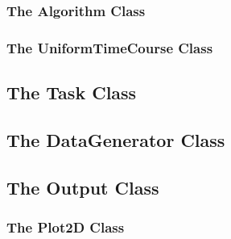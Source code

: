  \subsubsection[Algorithm]{The Algorithm Class}
 

 \subsubsection[UniformTimeCourse]{The UniformTimeCourse Class}
 


%

%


 \subsection[Task]{The Task Class}
 


 \subsection[DataGenerator]{The DataGenerator Class}
 


\subsection[Output]{The Output Class}


\subsubsection[Plot2D]{The Plot2D Class}


